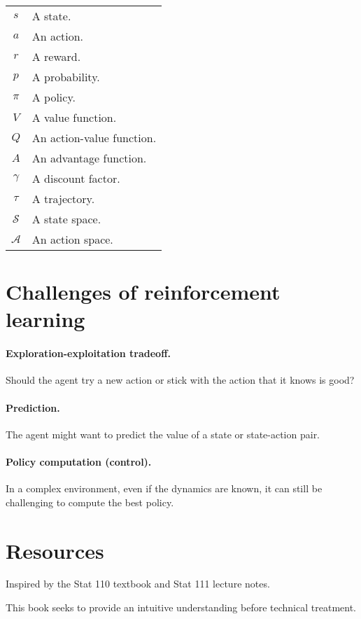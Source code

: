 \documentclass[../main/main]{subfiles}
\begin{document}
\begin{tabular}{cl}
    $s$ & A state. \\
    $a$ & An action. \\
    $r$ & A reward. \\
    $p$ & A probability. \\
    $\pi$ & A policy. \\
    $V$ & A value function. \\
    $Q$ & An action-value function. \\
    $A$ & An advantage function. \\
    $\gamma$ & A discount factor. \\
    $\tau$ & A trajectory. \\
    $\mathcal{S}$ & A state space. \\
    $\mathcal{A}$ & An action space.
\end{tabular}



\section{Challenges of reinforcement learning}

\paragraph{Exploration-exploitation tradeoff.} Should the agent try a new action or stick with the action that it knows is good?

\paragraph{Prediction.} The agent might want to predict the value of a state or state-action pair.

\paragraph{Policy computation (control).} In a complex environment, even if the dynamics are known, it can still be challenging to compute the best policy.


\section{Resources}

Inspired by the Stat 110 textbook and Stat 111 lecture notes.

This book seeks to provide an intuitive understanding before technical treatment.

\end{document}

